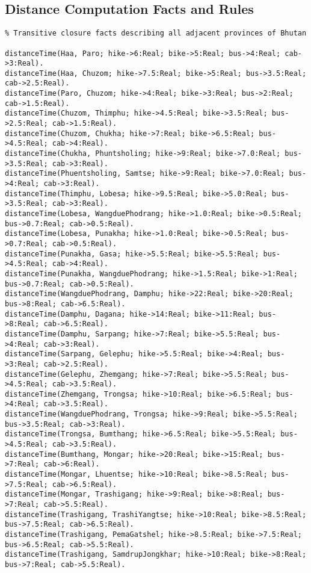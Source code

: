 \subsection*{Distance Computation Facts and Rules}
\singlespacing
\scriptsize
\begin{verbatim}
% Transitive closure facts describing all adjacent provinces of Bhutan

distanceTime(Haa, Paro; hike->6:Real; bike->5:Real; bus->4:Real; cab->3:Real).
distanceTime(Haa, Chuzom; hike->7.5:Real; bike->5:Real; bus->3.5:Real; cab->2.5:Real).
distanceTime(Paro, Chuzom; hike->4:Real; bike->3:Real; bus->2:Real; cab->1.5:Real).
distanceTime(Chuzom, Thimphu; hike->4.5:Real; bike->3.5:Real; bus->2.5:Real; cab->1.5:Real).
distanceTime(Chuzom, Chukha; hike->7:Real; bike->6.5:Real; bus->4.5:Real; cab->4:Real).
distanceTime(Chukha, Phuntsholing; hike->9:Real; bike->7.0:Real; bus->3.5:Real; cab->3:Real).
distanceTime(Phuentsholing, Samtse; hike->9:Real; bike->7.0:Real; bus->4:Real; cab->3:Real).
distanceTime(Thimphu, Lobesa; hike->9.5:Real; bike->5.0:Real; bus->3.5:Real; cab->3:Real).
distanceTime(Lobesa, WangduePhodrang; hike->1.0:Real; bike->0.5:Real; bus->0.7:Real; cab->0.5:Real).
distanceTime(Lobesa, Punakha; hike->1.0:Real; bike->0.5:Real; bus->0.7:Real; cab->0.5:Real).
distanceTime(Punakha, Gasa; hike->5.5:Real; bike->5.5:Real; bus->4.5:Real; cab->4:Real).
distanceTime(Punakha, WangduePhodrang; hike->1.5:Real; bike->1:Real; bus->0.7:Real; cab->0.5:Real).
distanceTime(WangduePhodrang, Damphu; hike->22:Real; bike->20:Real; bus->8:Real; cab->6.5:Real).
distanceTime(Damphu, Dagana; hike->14:Real; bike->11:Real; bus->8:Real; cab->6.5:Real).
distanceTime(Damphu, Sarpang; hike->7:Real; bike->5.5:Real; bus->4:Real; cab->3:Real).
distanceTime(Sarpang, Gelephu; hike->5.5:Real; bike->4:Real; bus->3:Real; cab->2.5:Real).
distanceTime(Gelephu, Zhemgang; hike->7:Real; bike->5.5:Real; bus->4.5:Real; cab->3.5:Real).
distanceTime(Zhemgang, Trongsa; hike->10:Real; bike->6.5:Real; bus->4:Real; cab->3.5:Real).
distanceTime(WangduePhodrang, Trongsa; hike->9:Real; bike->5.5:Real; bus->3.5:Real; cab->3:Real).
distanceTime(Trongsa, Bumthang; hike->6.5:Real; bike->5.5:Real; bus->4.5:Real; cab->3.5:Real).
distanceTime(Bumthang, Mongar; hike->20:Real; bike->15:Real; bus->7:Real; cab->6:Real).
distanceTime(Mongar, Lhuentse; hike->10:Real; bike->8.5:Real; bus->7.5:Real; cab->6.5:Real).
distanceTime(Mongar, Trashigang; hike->9:Real; bike->8:Real; bus->7:Real; cab->5.5:Real).
distanceTime(Trashigang, TrashiYangtse; hike->10:Real; bike->8.5:Real; bus->7.5:Real; cab->6.5:Real).
distanceTime(Trashigang, PemaGatshel; hike->8.5:Real; bike->7.5:Real; bus->6.5:Real; cab->5.5:Real).
distanceTime(Trashigang, SamdrupJongkhar; hike->10:Real; bike->8:Real; bus->7:Real; cab->5.5:Real).

\end{verbatim}
